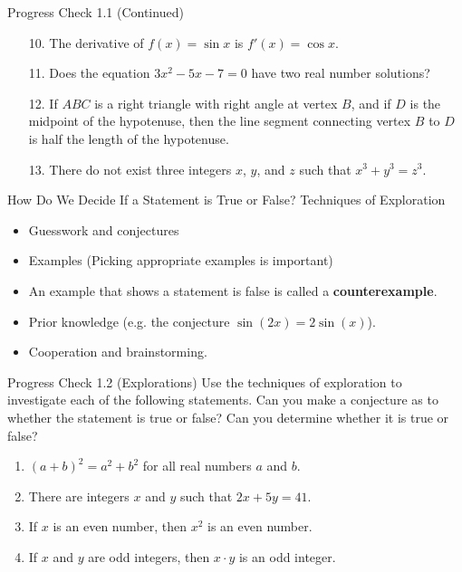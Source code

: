 \documentclass{beamer}
\begin{document}
\begin{frame}{Progress Check 1.1 (Continued)}
	\begin{enumerate}
		\item[10.] The derivative of $f(x) = \sin x$ is $f'(x) = \cos x$.
		\item[11.] Does the equation $3x^2 - 5x - 7 = 0$ have two real number solutions?
		\item[12.] If $ABC$ is a right triangle with right angle at vertex $B$, and if $D$ is the
		midpoint of the hypotenuse, then the line segment connecting vertex $B$ to $D$
		is half the length of the hypotenuse.
		\item[13.] There do not exist three integers $x$, $y$, and $z$ such that $x^3 + y^3 = z^3$.
	\end{enumerate}
\end{frame}

\begin{frame}{How Do We Decide If a Statement is True or False?}
	Techniques of Exploration
	\begin{itemize}
		\item Guesswork and conjectures
		\item Examples (Picking appropriate examples is important)
		\item An example that shows a statement is false is called a \textbf{counterexample}.
		\item Prior knowledge (e.g. the conjecture $\sin(2x) = 2\sin(x)$).
		\item Cooperation and brainstorming.
	\end{itemize}
\end{frame}

\begin{frame}{Progress Check 1.2 (Explorations)}
	Use the techniques of exploration to investigate each of the following statements.
	Can you make a conjecture as to whether the statement is true or false? Can you
	determine whether it is true or false?
	\begin{enumerate}
		\item \((a+b)^2 = a^2 + b^2\) for all real numbers $a$ and $b$.
		\item There are integers $x$ and $y$ such that $2x + 5y = 41$.
		\item If $x$ is an even number, then $x^2$ is an even number.
		\item If $x$ and $y$ are odd integers, then $x \cdot y$ is an odd integer.
	\end{enumerate}
\end{frame}
\end{document}
